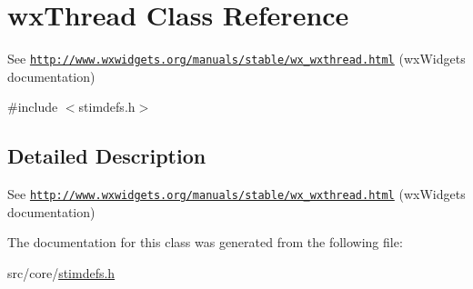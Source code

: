 \hypertarget{classwxThread}{
\section{wxThread Class Reference}
\label{classwxThread}
}


See \href{http://www.wxwidgets.org/manuals/stable/wx_wxthread.html}{\tt http://www.wxwidgets.org/manuals/stable/wx\_\-wxthread.html} (wxWidgets documentation)  




{\ttfamily \#include $<$stimdefs.h$>$}



\subsection{Detailed Description}
See \href{http://www.wxwidgets.org/manuals/stable/wx_wxthread.html}{\tt http://www.wxwidgets.org/manuals/stable/wx\_\-wxthread.html} (wxWidgets documentation) 

The documentation for this class was generated from the following file:\begin{DoxyCompactItemize}
\item 
src/core/\hyperlink{stimdefs_8h}{stimdefs.h}\end{DoxyCompactItemize}
